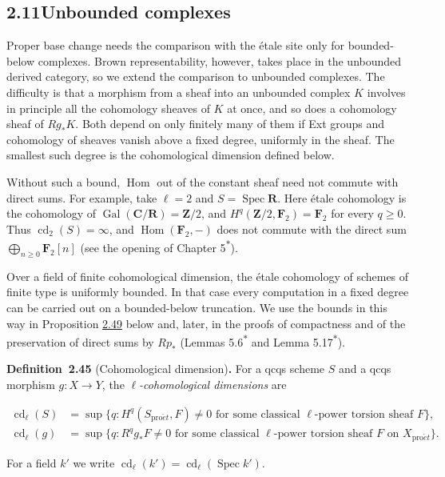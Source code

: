 \documentclass[11pt]{article}
\newenvironment{bpstatement}[2]{\par\addvspace{0.6\baselineskip}\noindent\textbf{#1}#2\textbf{.}\enspace\ignorespaces}
  {\par\addvspace{0.4\baselineskip}}
\newcommand{\bpout}[1]{#1\textsuperscript{\hyperlink{bp-outside}{\ensuremath{\ast}}}}
\providecommand{\Hom}{}\renewcommand{\Hom}{\operatorname{Hom}}
\begin{document}
\subsection*{\texorpdfstring{2.11\quad Unbounded complexes}{2.11 Unbounded complexes}}
\label{bp133}%
\label{bp134}%
Proper base change needs the comparison with the étale site only for bounded-below complexes. Brown representability, however, takes place in the unbounded derived category, so we extend the comparison to unbounded complexes. The difficulty is that a morphism from a sheaf into an unbounded complex \(K\) involves in principle all the cohomology sheaves of \(K\) at once, and so does a cohomology sheaf of \(Rg_*K\). Both depend on only finitely many of them if Ext groups and cohomology of sheaves vanish above a fixed degree, uniformly in the sheaf. The smallest such degree is the cohomological dimension defined below.

Without such a bound, \(\Hom\) out of the constant sheaf need not commute with direct sums. For example, take \(\ell=2\) and \(S=\operatorname{Spec}\mathbf R\). Here étale cohomology is the cohomology of \(\operatorname{Gal}(\mathbf C/\mathbf R)=\mathbf Z/2\), and \(H^q(\mathbf Z/2,\mathbf F_2)=\mathbf F_2\) for every \(q\geq0\). Thus \(\operatorname{cd}_2(S)=\infty\), and \(\Hom(\mathbf F_2,-)\) does not commute with the direct sum \(\bigoplus_{n\geq0}\mathbf F_2[n]\) (see the opening of Chapter \bpout{5}).

Over a field of finite cohomological dimension, the étale cohomology of schemes of finite type is uniformly bounded. In that case every computation in a fixed degree can be carried out on a bounded-below truncation. We use the bounds in this way in Proposition \hyperref[bp144]{2.49} below and, later, in the proofs of compactness and of the preservation of direct sums by \(Rp_*\) (Lemmas \bpout{5.6} and \bpout{Lemma 5.17}).

\label{bp135}%
\begin{bpstatement}{Definition~2.45}{ (Cohomological dimension)}
For a qcqs scheme \(S\) and a qcqs morphism \(g:X\to Y\), the \emph{\(\ell\)-cohomological dimensions} are

\[
\begin{aligned}
\operatorname{cd}_\ell(S)&=\sup\{q: H^q(S_{\mathrm{pro}\acute{e}t},F)\neq0
\text{ for some classical $\ell$-power torsion sheaf $F$}\},\\
\operatorname{cd}_\ell(g)&=\sup\{q: R^qg_*F\neq0
\text{ for some classical $\ell$-power torsion sheaf $F$ on }X_{\mathrm{pro}\acute{e}t}\}.
\end{aligned}
\]

For a field \(k'\) we write \(\operatorname{cd}_\ell(k')=\operatorname{cd}_\ell(\operatorname{Spec}k')\).
\end{bpstatement}
\end{document}
